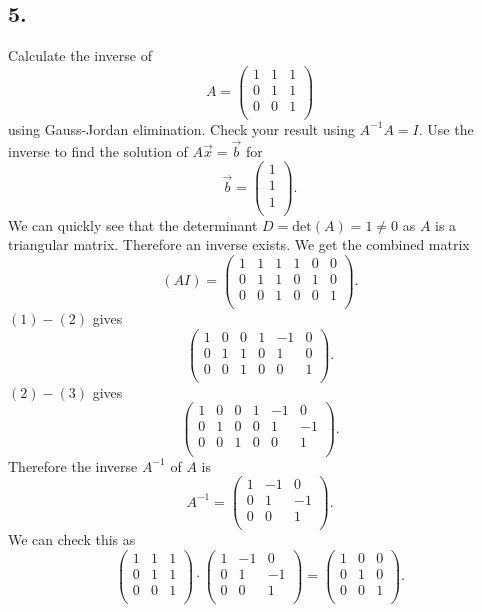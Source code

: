 \subsection*{5.}
Calculate the inverse of
\[ 
A = \begin{pmatrix}
1 & 1 & 1\\
0 & 1 & 1\\
0 & 0 & 1\\
\end{pmatrix}
\]
using Gauss-Jordan elimination. Check your result using $A^{-1} A = I$. Use the inverse to find the solution of $A \Vec{x} = \Vec{b}$ for
\[ 
\Vec{b} = \begin{pmatrix}
1\\
1\\
1\\
\end{pmatrix}
.\]
\bigbreak
We can quickly see that the determinant $D = \mathrm{det}(A) = 1 \neq 0$ as $A$ is a triangular matrix. Therefore an inverse exists. We get the combined matrix
\[ 
  (AI) = \begin{pmatrix}
    1 & 1 & 1 & 1 & 0 & 0\\
    0 & 1 & 1 & 0 & 1 & 0\\
    0 & 0 & 1 & 0 & 0 & 1\\
  \end{pmatrix}
.\]
$(1) - (2)$ gives
\[ 
\begin{pmatrix}
1 & 0 & 0 & 1 & -1 & 0\\
0 & 1 & 1 & 0 & 1 & 0\\
0 & 0 & 1 & 0 & 0 & 1\\
\end{pmatrix}
.\]
$(2) - (3)$ gives
\[ 
\begin{pmatrix}
1 & 0 & 0 & 1 & -1 & 0\\
0 & 1 & 0 & 0 & 1 & -1\\
0 & 0 & 1 & 0 & 0 & 1\\
\end{pmatrix}
.\]
Therefore the inverse $A^{-1}$ of $A$ is
\[ 
A^{-1} = \begin{pmatrix}
1 & -1 & 0\\
0 & 1 & -1\\
0 & 0 & 1\\
\end{pmatrix}
.\]
We can check this as
\[ 
 \begin{pmatrix}1 & 1 & 1\\0 & 1 & 1\\0 & 0 & 1\\\end{pmatrix} \cdot \begin{pmatrix}1 & -1 & 0\\0 & 1 & -1\\0 & 0 & 1\\\end{pmatrix} = \left(\begin{array}{ccc} 1 & 0 & 0 \\ 0 & 1 & 0 \\ 0 & 0 & 1 \\\end{array}\right)
.\]
